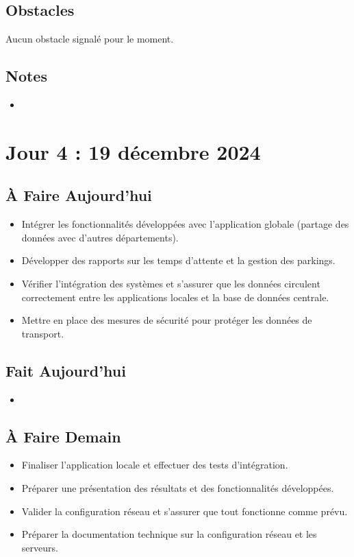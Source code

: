 \documentclass[a4paper,12pt]{report}
\begin{document}
\subsection{Obstacles}
Aucun obstacle signalé pour le moment.

\subsection{Notes}
\begin{itemize}
    \item
\end{itemize}

\section{Jour 4 : 19 décembre 2024}

\subsection{À Faire Aujourd'hui}
\begin{itemize}
    \item Intégrer les fonctionnalités développées avec l'application globale (partage des données avec d'autres départements).
    \item Développer des rapports sur les temps d'attente et la gestion des parkings.
    \item Vérifier l'intégration des systèmes et s'assurer que les données circulent correctement entre les applications locales et la base de données centrale.
    \item Mettre en place des mesures de sécurité pour protéger les données de transport.
\end{itemize}

\subsection{Fait Aujourd'hui}
\begin{itemize}
    \item
\end{itemize}

\subsection{À Faire Demain}
\begin{itemize}
    \item Finaliser l'application locale et effectuer des tests d'intégration.
    \item Préparer une présentation des résultats et des fonctionnalités développées.
    \item Valider la configuration réseau et s'assurer que tout fonctionne comme prévu.
    \item Préparer la documentation technique sur la configuration réseau et les serveurs.
\end{itemize}
\end{document}
